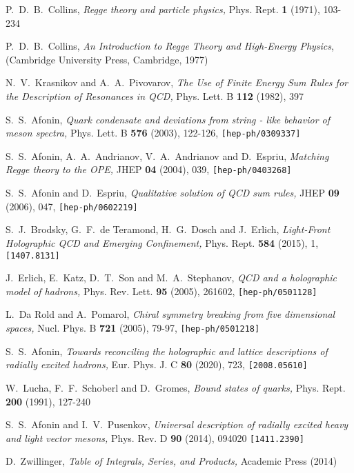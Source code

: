 \documentclass[a4paper,11pt]{article}
\begin{document}
\begin{thebibliography}{99}
  P.~D.~B.~Collins,
  \textit{Regge theory and particle physics,}
  Phys. Rept. \textbf{1} (1971), 103-234

  P.~D.~B.~Collins,
  \textit{An Introduction to Regge Theory and High-Energy Physics},
  (Cambridge University Press, Cambridge, 1977)

  N.~V.~Krasnikov and A.~A.~Pivovarov,
  \textit{The Use of Finite Energy Sum Rules for the Description of Resonances in {QCD},}
  Phys. Lett. B \textbf{112} (1982), 397

  S.~S.~Afonin,
  \textit{Quark condensate and deviations from string - like behavior of meson spectra,}
  Phys. Lett. B \textbf{576} (2003), 122-126,
  \texttt{[hep-ph/0309337]}

  S.~S.~Afonin, A.~A.~Andrianov, V.~A.~Andrianov and D.~Espriu,
  \textit{Matching Regge theory to the OPE,}
  JHEP \textbf{04} (2004), 039,
  \texttt{[hep-ph/0403268]}

  S.~S.~Afonin and D.~Espriu,
  \textit{Qualitative solution of QCD sum rules,}
  JHEP \textbf{09} (2006), 047,
  \texttt{[hep-ph/0602219]}

  S.~J.~Brodsky, G.~F.~de Teramond, H.~G.~Dosch and J.~Erlich,
  \textit{Light-Front Holographic QCD and Emerging Confinement,}
  Phys. Rept. \textbf{584} (2015), 1,
  \texttt{[1407.8131]}

  J.~Erlich, E.~Katz, D.~T.~Son and M.~A.~Stephanov,
  \textit{QCD and a holographic model of hadrons,}
  Phys. Rev. Lett. \textbf{95} (2005), 261602,
  \texttt{[hep-ph/0501128]}

  L.~Da Rold and A.~Pomarol,
  \textit{Chiral symmetry breaking from five dimensional spaces,}
  Nucl. Phys. B \textbf{721} (2005), 79-97,
  \texttt{[hep-ph/0501218]}

  S.~S.~Afonin,
  \textit{Towards reconciling the holographic and lattice descriptions of radially excited hadrons,}
  Eur. Phys. J. C \textbf{80} (2020), 723,
  \texttt{[2008.05610]}

  W.~Lucha, F.~F.~Schoberl and D.~Gromes,
  \textit{Bound states of quarks,}
  Phys. Rept. \textbf{200} (1991), 127-240

  S.~S.~Afonin and I.~V.~Pusenkov,
  \textit{Universal description of radially excited heavy and light vector mesons,}
  Phys. Rev. D \textbf{90} (2014), 094020
  \texttt{[1411.2390]}


  D.~Zwillinger,
  \textit{Table of Integrals, Series, and Products,}
  Academic Press (2014)

\end{thebibliography}
\end{document}

